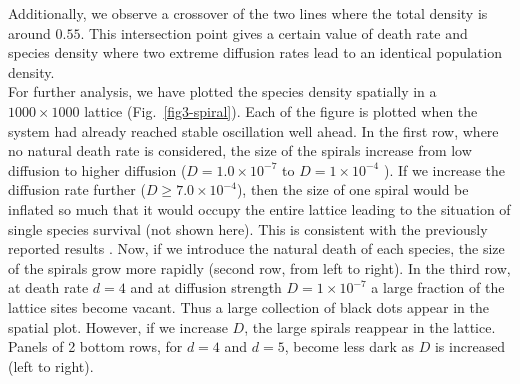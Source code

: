 \documentclass[aps, pre, twocolumn, amsmath, superscriptaddress,showkeys,showpacs]{revtex4-1}
\begin{document}
 Additionally, we observe a crossover of the two  lines where the total density is around $0.55$. 
This intersection point gives a certain value of death rate and species density where two extreme diffusion rates lead to an identical population density. 
\\
For further analysis, we have plotted the species density spatially in a  $1000\times 1000$ lattice (Fig.\  \ref{fig3-spiral}). { Each of the figure is plotted  when the system had already reached  stable oscillation well ahead.} In the first row, where no natural death rate is considered, the size of the spirals increase from low diffusion to higher diffusion ($D=1.0\times 10^{-7}$ to $D=1\times 10^{-4}$ ). {If we increase the diffusion rate further ($D\geq7.0\times 10^{-4}$), then the size of one spiral would be inflated so much that it would occupy the entire lattice leading to the situation of single species survival {(not shown here)}.} %
This is consistent with the previously reported results \cite{reichenbach2007mobility}. Now, if we introduce the natural death of each species, the size of the spirals grow more rapidly  %
(second row, from left to right). In the third row, at death rate $d=4$ and at diffusion strength $D=1\times 10^{-7}$ a large fraction of the lattice sites become vacant. Thus a large collection of black dots appear in the spatial plot. However, if we increase $D$, the large spirals reappear in the lattice. %
{Panels of 2 bottom rows, for $d=4$ and $d=5$, become less dark as $D$ is increased (left to right). }
\end{document}
